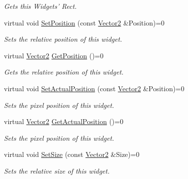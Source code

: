 \begin{DoxyCompactItemize}
\begin{DoxyCompactList}\small\item\em Gets this Widgets' Rect. \item\end{DoxyCompactList}\item 
virtual void \hyperlink{classphys_1_1UI_1_1Widget_a3ef894be2c0868105b2bf495ae944d00}{SetPosition} (const \hyperlink{classphys_1_1Vector2}{Vector2} \&Position)=0
\begin{DoxyCompactList}\small\item\em Sets the relative position of this widget. \item\end{DoxyCompactList}\item 
virtual \hyperlink{classphys_1_1Vector2}{Vector2} \hyperlink{classphys_1_1UI_1_1Widget_a3e464b028b0d1b5755923b8790260c33}{GetPosition} ()=0
\begin{DoxyCompactList}\small\item\em Gets the relative position of this widget. \item\end{DoxyCompactList}\item 
virtual void \hyperlink{classphys_1_1UI_1_1Widget_a77727351d98b10f1f4eb45048cb882e3}{SetActualPosition} (const \hyperlink{classphys_1_1Vector2}{Vector2} \&Position)=0
\begin{DoxyCompactList}\small\item\em Sets the pixel position of this widget. \item\end{DoxyCompactList}\item 
virtual \hyperlink{classphys_1_1Vector2}{Vector2} \hyperlink{classphys_1_1UI_1_1Widget_a0a29fecff7f56d7909f65fd63b0990e7}{GetActualPosition} ()=0
\begin{DoxyCompactList}\small\item\em Sets the pixel position of this widget. \item\end{DoxyCompactList}\item 
virtual void \hyperlink{classphys_1_1UI_1_1Widget_a00f73c12583d25a75c089f944075b24d}{SetSize} (const \hyperlink{classphys_1_1Vector2}{Vector2} \&Size)=0
\begin{DoxyCompactList}\small\item\em Sets the relative size of this widget. \item\end{DoxyCompactList}\item 

\end{DoxyCompactItemize}

